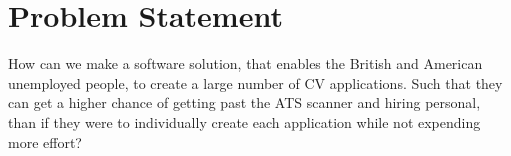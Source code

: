 \section{Problem Statement}\label{sec:problem}
How can we make a software solution, that enables the British and American unemployed people, 
to create a large number of CV applications.
Such that they can get a higher chance of getting past the ATS scanner and hiring personal, than
if they were to individually create each application while not expending more effort? 